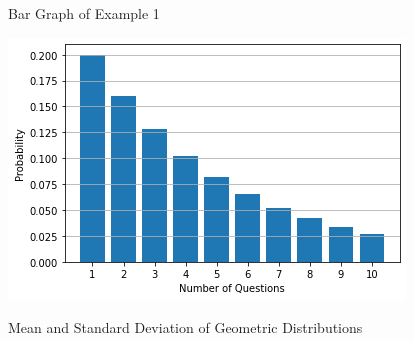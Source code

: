 \documentclass[t]{beamer}
\begin{document}
\begin{frame}{Bar Graph of Example 1}
\begin{center}
\includegraphics[scale=0.6]{../Images/geometric_mult_choice.png}
\end{center}
\end{frame}

\begin{frame}{Mean and Standard Deviation of Geometric Distributions}

\end{frame}

\end{document}
